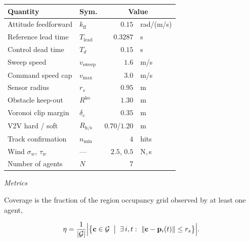 \documentclass[10pt,letterpaper]{article}
\newcommand{\headingthree}[1]{%
    \par\vspace{6pt}%
    {\centering\fontsize{10}{12}\selectfont\itshape #1\par}%
    \vspace{2pt}\noindent\ignorespaces}
\begin{document}
\begin{table}[tbp]
\begin{minipage}[t]{0.49\textwidth}
\begin{tabular}{llr@{\,}l}
            \toprule
            \textbf{Quantity}         & \textbf{Sym.}        & \multicolumn{2}{c}{\textbf{Value}}             \\
            \midrule
            Attitude feedforward      & $k_{\mathrm{ff}}$    & $0.15$                             & rad/(m/s) \\
            Reference lead time       & $T_{\mathrm{lead}}$  & $0.3287$                           & s         \\
            Control dead time         & $T_d$                & $0.15$                             & s         \\
            Sweep speed               & $v_{\mathrm{sweep}}$ & $1.6$                              & m/s       \\
            Command speed cap         & $v_{\max}$           & $3.0$                              & m/s       \\
            Sensor radius             & $r_s$                & $0.95$                             & m         \\
            Obstacle keep-out         & $R^{\mathrm{ko}}$    & $1.30$                             & m         \\
            Voronoi clip margin       & $\delta_c$           & $0.35$                             & m         \\
            V2V hard / soft           & $R_{\mathrm{h/s}}$   & $0.70$/$1.20$                      & m         \\
            Track confirmation        & $n_{\min}$           & $4$                                & hits      \\
            Wind $\sigma_w$, $\tau_w$ & ---                  & $2.5$, $0.5$                       & N,\,s     \\
            Number of agents          & $N$                  & $7$                                &           \\
            \bottomrule
        \end{tabular}
    \end{minipage}
\end{table}

\headingthree{Metrics}

Coverage is the fraction of the region occupancy grid observed by at least one agent,

\begin{equation}
    \label{eq:e37}
    \eta=\frac{1}{|\mathcal{G}|}\Bigl|\bigl\{\mathbf{c}\in\mathcal{G}\;\bigm|\;
    \exists\,i,t:\ \|\mathbf{c}-\mathbf{p}_i(t)\|\le r_s\bigr\}\Bigr| .
\end{equation}
\end{document}
